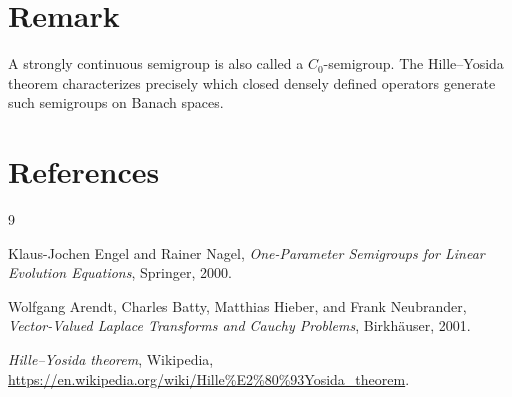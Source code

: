 \documentclass[11pt]{article}
\begin{document}
\section*{Remark}

A strongly continuous semigroup is also called a $C_0$-semigroup. The Hille--Yosida theorem characterizes precisely which closed densely defined operators generate such semigroups on Banach spaces.

\section*{References}

\begin{thebibliography}{9}

Klaus-Jochen Engel and Rainer Nagel,
\textit{One-Parameter Semigroups for Linear Evolution Equations},
Springer, 2000.

Wolfgang Arendt, Charles Batty, Matthias Hieber, and Frank Neubrander,
\textit{Vector-Valued Laplace Transforms and Cauchy Problems},
Birkh\"auser, 2001.

\textit{Hille--Yosida theorem},
Wikipedia,
\url{https://en.wikipedia.org/wiki/Hille%E2%80%93Yosida_theorem}.

\end{thebibliography}
\end{document}
